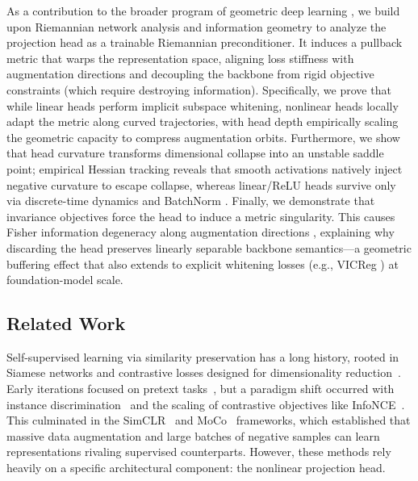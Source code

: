 \documentclass{article}
\theoremstyle{plain}
\theoremstyle{definition}
\theoremstyle{remark}
\begin{document}
As a contribution to the broader program of geometric deep learning \citep{bronstein2021geometricdeeplearning}, we build upon Riemannian network analysis \citep{ollivier2015riemannian} and information geometry \citep{amari2016information} to analyze the projection head as a trainable Riemannian preconditioner. It induces a pullback metric that warps the representation space, aligning loss stiffness with augmentation directions and decoupling the backbone from rigid objective constraints (which require destroying information). Specifically, we prove that while linear heads perform implicit subspace whitening, nonlinear heads locally adapt the metric along curved trajectories, with head depth empirically scaling the geometric capacity to compress augmentation orbits. Furthermore, we show that head curvature transforms dimensional collapse into an unstable saddle point; empirical Hessian tracking reveals that smooth activations natively inject negative curvature to escape collapse, whereas linear/ReLU heads survive only via discrete-time dynamics \citep{cohen2022gradientdescentneuralnetworks} and BatchNorm \citep{santurkar2019how}. Finally, we demonstrate that invariance objectives force the head to induce a metric singularity. This causes Fisher information degeneracy along augmentation directions \citep{amari2016information}, explaining why discarding the head preserves linearly separable backbone semantics---a geometric buffering effect that also extends to explicit whitening losses (e.g., VICReg \citep{bardes2022vicreg}) at foundation-model scale.

\subsection{Related Work}

Self-supervised learning via similarity preservation has a long history, rooted in Siamese networks and contrastive losses designed for dimensionality reduction~\citep{hadsell2006dimensionality}. Early iterations focused on pretext tasks~\citep{doersch2016unsupervised}, but a paradigm shift occurred with instance discrimination~\citep{wu2018unsupervised} and the scaling of contrastive objectives like InfoNCE~\citep{oord2019representation}. This culminated in the SimCLR~\citep{chen2020simclr} and MoCo~\citep{he2020moco} frameworks, which established that massive data augmentation and large batches of negative samples can learn representations rivaling supervised counterparts. However, these methods rely heavily on a specific architectural component: the nonlinear projection head.
\end{document}
